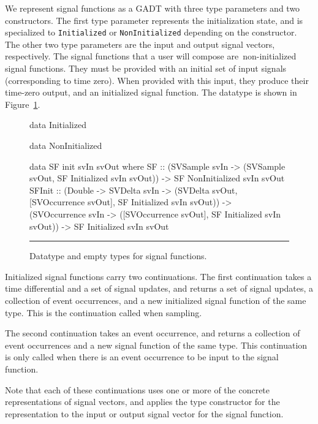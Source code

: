 We represent signal functions as a GADT with three type parameters and two 
constructors. The first type parameter represents the initialization state,
and is specialized to {\tt Initialized} or {\tt NonInitialized} depending on the
constructor. The other two type parameters are the input and output signal
vectors, respectively. The signal functions that a user will compose are\
non-initialized signal functions. They must be provided with an initial set of
input signals (corresponding to time zero). When provided with this input, they
produce their time-zero output, and an initialized signal function. The datatype
is shown in Figure~\ref{figure:signal_function_datatype}.

\begin{figure}
\begin{code}
data Initialized

data NonInitialized

data SF init svIn svOut where
  SF     ::    (SVSample svIn 
                  -> (SVSample svOut,
                      SF Initialized svIn svOut)) 
            -> SF NonInitialized svIn svOut
  SFInit ::    (Double 
                  -> SVDelta svIn
                  -> (SVDelta svOut,
                      [SVOccurrence svOut],
                      SF Initialized svIn svOut)) 
            -> (SVOccurrence svIn
                  -> ([SVOccurrence svOut],
                      SF Initialized svIn svOut))
            -> SF Initialized svIn svOut
\end{code}
\hrule
\caption{Datatype and empty types for signal functions.}
\label{figure:signal_function_datatype}
\end{figure}

Initialized signal functions carry two continuations. The first continuation
takes a time differential and a set of signal updates, and returns a set of
signal updates, a collection of event occurrences, and a new initialized signal
function of the same type. This is the continuation called when sampling.

The second continuation takes an event occurrence, and returns a collection of
event occurrences and a new signal function of the same type. This continuation
is only called when there is an event occurrence to be input to the signal
function.

Note that each of these continuations uses one or more of the concrete
representations of signal vectors, and applies the type constructor for the
representation to the input or output signal vector for the signal function.

